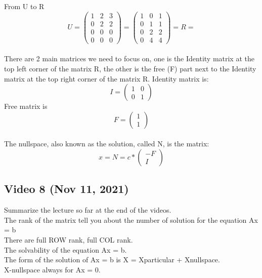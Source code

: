 \documentclass{article}
\begin{document}
From U to R
\begin{equation}
U = 
\left({\begin{array}{ccc} 1 & 2 & 3 \\ 0 & 2 & 2 \\ 0 & 0 & 0  \\ 0 & 0 & 0 \end{array}}\right)=
\left({\begin{array}{ccc} 1 & 0 & 1 \\ 0 & 1 & 1 \\ 0 & 2 & 2 \\ 0 & 4 & 4 \end{array}}\right)
= R =
\end{equation}
\\ There are 2 main matrices we need to focus on, one is the Identity matrix at the top left corner of the matrix R, the other is the free (F) part next to the Identity matrix at the top right corner of the matrix R.
Identity matrix is:
\begin{equation}
I = 
\left({\begin{array}{cc} 1 & 0 \\ 0 & 1 \end{array}}\right)
\end{equation}
Free matrix is
\begin{equation}
F =
\left({\begin{array}{c} 1 \\ 1 \end{array}}\right)
\end{equation}
\\ The nullspace, also known as the solution, called N, is the matrix:
\begin{equation}
x = N =
c * \left({\begin{array}{c} - F \\ I \end{array}}\right)
\end{equation}

\subsection{Video 8 (Nov 11, 2021)}

Summarize the lecture so far at the end of the videos.
\\The rank of the matrix tell you about the number of solution for the equation Ax = b
\\There are full ROW rank, full COL rank.
\\The solvability of the equation Ax = b.
\\The form of the solution of Ax = b is X = Xparticular + Xnullspace.
\\X-nullspace always for Ax = 0.
\end{document}
